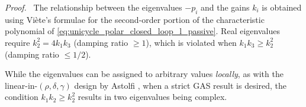 \documentclass[journal,twoside,web]{ieeecolor}
\theoremstyle{definition}
\renewenvironment{proof}[1][Proof]{\par\pushQED{\qed}\normalfont\textit{#1.}~}{\popQED\par}
\begin{document}
\begin{proof} The relationship between the eigenvalues $-p_i$ and the gains $k_i$ is obtained using Vi\`{e}te's formulae for the second-order portion of the characteristic polynomial of \eqref{eq:unicycle_polar_closed_loop_l_passive}. Real eigenvalues require $k_2^2 = 4k_1k_3$ (damping ratio $\ge 1$), which is violated when $k_1 k_3 \ge k_2^2$ (damping ratio  $\le 1/2$). 
\end{proof}

While the eigenvalues can be assigned to arbitrary values {\em locally}, as with the linear-in-$(\rho,\delta,\gamma)$ design by Astolfi \cite[Prop. 1]{astolfi1999exponential}, when a strict GAS result is desired, the condition $k_1  k_2 \ge k_2^2$ results in two eigenvalues being complex. 

\end{document}
